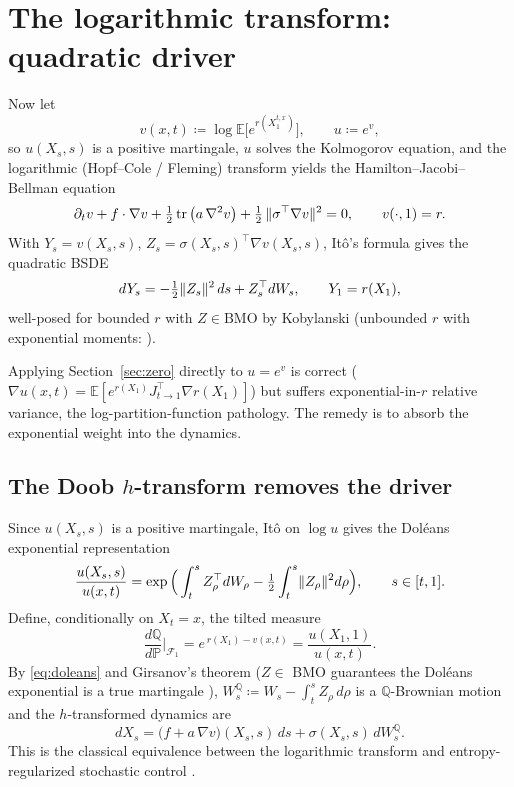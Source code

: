 \documentclass[11pt]{article}
\theoremstyle{definition}
\theoremstyle{remark}
\newcommand{\E}{\mathbb{E}}
\newcommand{\Q}{\mathbb{Q}}
\newcommand{\Pmeas}{\mathbb{P}}
\newcommand{\F}{\mathcal{F}}
\newcommand{\tr}{\operatorname{tr}}
\newcommand{\grad}{\nabla}
\DeclarePairedDelimiter{\norm}{\lVert}{\rVert}
\begin{document}
\section{The logarithmic transform: quadratic driver}\label{sec:log}

Now let
\begin{equation}
v(x,t) \coloneqq \log \E\big[e^{r(X^{t,x}_1)}\big],
\qquad u \coloneqq e^{v},
\end{equation}
so $u(X_s,s)$ is a positive martingale, $u$ solves the Kolmogorov equation, and the
logarithmic (Hopf--Cole / Fleming) transform \cite[Ch.~VI]{FlemingSoner} yields the
Hamilton--Jacobi--Bellman equation
\begin{equation}\label{eq:hjb}
\partial_t v + f\cdot\grad v + \tfrac12 \tr\big(a\,\grad^2 v\big)
+ \tfrac12\,\norm{\sigma^\top \grad v}^2 = 0,
\qquad v(\cdot,1) = r .
\end{equation}
With $Y_s = v(X_s,s)$, $Z_s = \sigma(X_s,s)^\top\grad v(X_s,s)$, It\^o's formula gives the
quadratic BSDE
\begin{equation}\label{eq:qbsde}
dY_s = -\tfrac12\norm{Z_s}^2\,ds + Z_s^\top dW_s,\qquad Y_1 = r(X_1),
\end{equation}
well-posed for bounded $r$ with $Z\in\mathrm{BMO}$ by Kobylanski \cite{Kobylanski} (unbounded
$r$ with exponential moments: \cite{BriandHu}).

Applying Section~\ref{sec:zero} directly to $u=e^v$ is correct
($\grad u(x,t) = \E[e^{r(X_1)} J_{t\to1}^\top \grad r(X_1)]$) but suffers exponential-in-$r$
relative variance, the log-partition-function pathology. The remedy is to absorb the
exponential weight into the dynamics.

\subsection{The Doob $h$-transform removes the driver}

Since $u(X_s,s)$ is a positive martingale, It\^o on $\log u$ gives the Dol\'eans exponential
representation
\begin{equation}\label{eq:doleans}
\frac{u(X_s,s)}{u(x,t)}
= \exp\Big(\int_t^s Z_\rho^\top dW_\rho - \tfrac12\int_t^s \norm{Z_\rho}^2 d\rho\Big),
\qquad s\in[t,1].
\end{equation}
Define, conditionally on $X_t = x$, the tilted measure
\begin{equation}\label{eq:Q}
\frac{d\Q}{d\Pmeas}\Big|_{\F_1} = e^{\,r(X_1) - v(x,t)} = \frac{u(X_1,1)}{u(x,t)} .
\end{equation}
By \eqref{eq:doleans} and Girsanov's theorem ($Z\in$ BMO guarantees the Dol\'eans exponential
is a true martingale \cite{Kazamaki}), $W^\Q_s \coloneqq W_s - \int_t^s Z_\rho\,d\rho$ is a
$\Q$-Brownian motion and the $h$-transformed dynamics are
\begin{equation}\label{eq:tilted}
dX_s = \big(f + a\,\grad v\big)(X_s,s)\,ds + \sigma(X_s,s)\,dW^\Q_s .
\end{equation}
This is the classical equivalence between the logarithmic transform and entropy-regularized
stochastic control \cite{FlemingSoner,DaiPra}.
\end{document}
